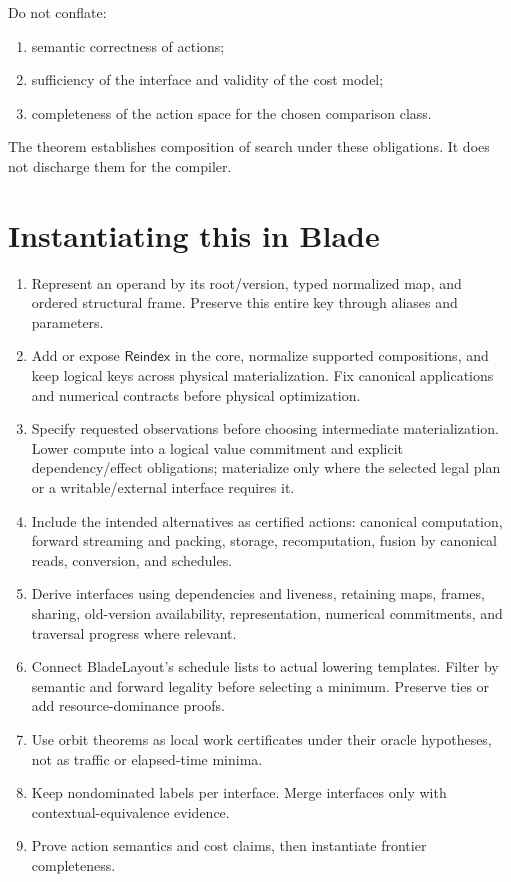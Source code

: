 \documentclass[11pt]{article}
\begin{document}
Do not conflate:
\begin{enumerate}
\item semantic correctness of actions;
\item sufficiency of the interface and validity of the cost model;
\item completeness of the action space for the chosen comparison class.
\end{enumerate}
The theorem establishes composition of search under these obligations. It does not discharge them for the compiler.

\section{Instantiating this in Blade}
\begin{enumerate}
\item Represent an operand by its root/version, typed normalized map, and ordered structural frame. Preserve this entire key through aliases and parameters.
\item Add or expose $\mathsf{Reindex}$ in the core, normalize supported compositions, and keep logical keys across physical materialization. Fix canonical applications and numerical contracts before physical optimization.
\item Specify requested observations before choosing intermediate materialization. Lower compute into a logical value commitment and explicit dependency/effect obligations; materialize only where the selected legal plan or a writable/external interface requires it.
\item Include the intended alternatives as certified actions: canonical computation, forward streaming and packing, storage, recomputation, fusion by canonical reads, conversion, and schedules.
\item Derive interfaces using dependencies and liveness, retaining maps, frames, sharing, old-version availability, representation, numerical commitments, and traversal progress where relevant.
\item Connect BladeLayout's schedule lists to actual lowering templates. Filter by semantic and forward legality before selecting a minimum. Preserve ties or add resource-dominance proofs.
\item Use orbit theorems as local work certificates under their oracle hypotheses, not as traffic or elapsed-time minima.
\item Keep nondominated labels per interface. Merge interfaces only with contextual-equivalence evidence.
\item Prove action semantics and cost claims, then instantiate frontier completeness.
\end{enumerate}
\end{document}
